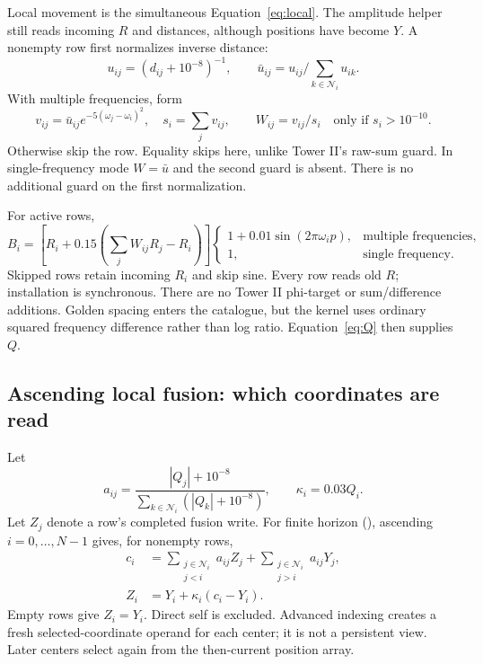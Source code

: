 Local movement is the simultaneous Equation~\eqref{eq:local}. The amplitude helper still reads incoming \(R\) and distances, although positions have become \(Y\). A nonempty row first normalizes inverse distance:
\begin{equation}\label{eq:Uweights}
u_{ij}=(d_{ij}+10^{-8})^{-1},\qquad
\bar u_{ij}=u_{ij}/\sum_{k\in\mathcal N_i}u_{ik}.
\end{equation}
With multiple frequencies, form
\begin{equation}\label{eq:Uguard}
v_{ij}=\bar u_{ij}e^{-5(\omega_j-\omega_i)^2},\quad
s_i=\sum_jv_{ij},\qquad W_{ij}=v_{ij}/s_i
\quad\text{only if }s_i>10^{-10}.
\end{equation}
Otherwise skip the row. Equality skips here, unlike Tower II's raw-sum guard. In single-frequency mode \(W=\bar u\) and the second guard is absent. There is no additional guard on the first normalization.

For active rows,
\begin{equation}\label{eq:UB}
B_i=\left[R_i+0.15\left(\sum_jW_{ij}R_j-R_i\right)\right]
\begin{cases}
1+0.01\sin(2\pi\omega_i p),&\text{multiple frequencies},\\
1,&\text{single frequency}.
\end{cases}
\end{equation}
Skipped rows retain incoming \(R_i\) and skip sine. Every row reads old \(R\); installation is synchronous. There are no Tower II phi-target or sum/difference additions. Golden spacing enters the catalogue, but the kernel uses ordinary squared frequency difference rather than log ratio. Equation~\eqref{eq:Q} then supplies \(Q\).

\subsection{Ascending local fusion: which coordinates are read}
Let
\[
a_{ij}=\frac{|Q_j|+10^{-8}}{\sum_{k\in\mathcal N_i}(|Q_k|+10^{-8})},
\qquad \kappa_i=0.03Q_i.
\]
Let \(Z_j\) denote a row's completed fusion write. For finite horizon (), ascending \(i=0,\ldots,N-1\) gives, for nonempty rows,
\begin{align}
c_i&=\sum_{\substack{j\in\mathcal N_i\\j<i}}a_{ij}Z_j
     +\sum_{\substack{j\in\mathcal N_i\\j>i}}a_{ij}Y_j,\label{eq:orderedcenter}\\
Z_i&=Y_i+\kappa_i(c_i-Y_i).\label{eq:orderedwrite}
\end{align}
Empty rows give \(Z_i=Y_i\). Direct self is excluded. Advanced indexing creates a fresh selected-coordinate operand for each center; it is not a persistent view. Later centers select again from the then-current position array.

